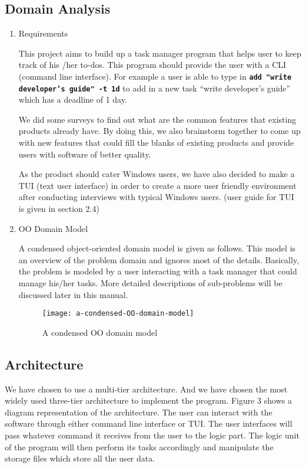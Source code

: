 \documentclass[12pt, a4paper]{article}
\newcommand{\cmdinline}[1]{{\bf \texttt{#1}}}
\begin{document}
\subsection{Domain Analysis}
\begin{enumerate} 
\item Requirements

This project aims to build up a task manager program that helps user to keep track of his /her
to-dos. This program should provide the user with a CLI (command line interface). For example a
user is able to type in \cmdinline{add "write developer's guide" -t 1d} to add in a new task ``write
developer's guide'' which has a deadline of 1 day.

We did some surveys to find out what are the common features that existing products
already have. By doing this, we also brainstorm together to come up with new features that could
fill the blanks of existing products and provide users with software of better quality.

As the product should cater Windows users, we have also decided to make a TUI (text user interface) in order to create a
more user friendly environment after conducting interviews with typical Windows users. (user guide for TUI is given in section 2.4)

\item OO Domain Model

A condensed object-oriented domain model is given as follows. This model is an overview of the
problem domain and ignores most of the details. Basically, the problem is modeled by a user
interacting with a task manager that could manage his/her tasks. More detailed descriptions of
sub-problems will be discussed later in this manual.

\begin{figure}[h]
  \centering
  \texttt{[image: a-condensed-OO-domain-model]}
  \caption{A condensed OO domain model}
\end{figure}
\end{enumerate}

\subsection{Architecture}
We have chosen to use a multi-tier architecture. And we have chosen the most widely used
three-tier architecture to implement the program. Figure 3 shows a diagram representation of
the architecture. The user can interact with the software through either command line interface
or TUI. The user interfaces will pass whatever command it receives from the user to the logic part.
The logic unit of the program will then perform its tasks accordingly and manipulate the storage
files which store all the user data.
\end{document}
